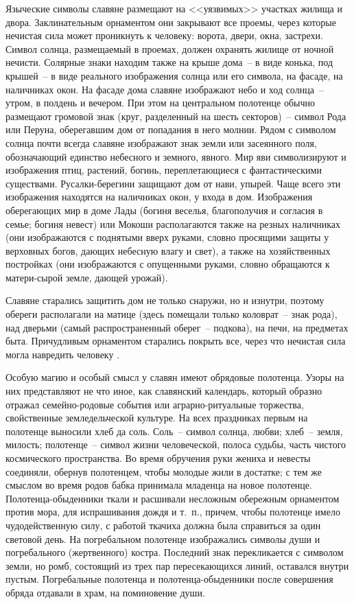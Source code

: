 \documentclass[pscyr,chapters]{hedwork}
\begin{document}
  Языческие символы славяне размещают на <<уязвимых>> участках жилища и двора.
  Заклинательным орнаментом они закрывают все проемы, через которые нечистая
  сила может проникнуть к человеку: ворота, двери, окна, застрехи. Символ
  солнца, размещаемый в проемах, должен охранять жилище от ночной нечисти.
  Солярные знаки находим также на крыше дома~-- в виде конька, под крышей~-- в
  виде реального изображения солнца или его символа, на фасаде, на наличниках
  окон. На фасаде дома славяне изображают небо и ход солнца~-- утром, в полдень
  и вечером. При этом на центральном полотенце обычно размещают громовой знак
  (круг, разделенный на шесть секторов)~-- символ Рода или Перуна, оберегавшим
  дом от попадания в него молнии. Рядом с символом солнца почти всегда славяне
  изображают знак земли или засеянного поля, обозначающий единство небесного и
  земного, явного. Мир яви символизируют и изображения птиц, растений, богинь,
  переплетающиеся с фантастическими существами. Русалки-берегини защищают дом от
  нави, упырей. Чаще всего эти изображения находятся на наличниках окон, у входа
  в дом. Изображения оберегающих мир в доме Лады (богиня веселья, благополучия и
  согласия в семье; богиня невест) или Мокоши располагаются также на резных
  наличниках (они изображаются с поднятыми вверх руками, словно просящими защиты
  у верховных богов, дающих небесную влагу и свет), а также на хозяйственных
  постройках (они изображаются с опущенными руками, словно обращаются к
  матери-сырой земле, дающей урожай).
 
  Славяне старались защитить дом не только снаружи, но и изнутри, поэтому
  обереги располагали на матице (здесь помещали только коловрат~-- знак рода),
  над дверьми (самый распространенный оберег~-- подкова), на печи, на предметах
  быта. Причудливым орнаментом старались покрыть все, через что нечистая сила
  могла навредить человеку \cite{2}.

  Особую магию и особый смысл у славян имеют обрядовые полотенца. Узоры на них
  представляют не что иное, как славянский календарь, который образно отражал
  семейно-родовые события или аграрно-ритуальные торжества, свойственные
  земледельческой культуре. На всех праздниках первым на полотенце выносили хлеб
  да соль. Соль~-- символ солнца, любви; хлеб~-- земля, милость; полотенце~--
  символ жизни человеческой, полоса судьбы, часть чистого космического
  пространства. Во время обручения руки жениха и невесты соединяли, обернув
  полотенцем, чтобы молодые жили в достатке; с тем же смыслом во время родов
  бабка принимала младенца на новое полотенце. Полотенца-обыденники ткали и
  расшивали несложным обережным орнаментом против мора, для испрашивания дождя
  и т.~п., причем, чтобы полотенце имело чудодейственную силу, с работой ткачиха
  должна была справиться за один световой день. На погребальном полотенце
  изображались символы души и погребального (жертвенного) костра. Последний знак
  перекликается с символом земли, но ромб, состоящий из трех пар пересекающихся
  линий, оставался внутри пустым. Погребальные полотенца и полотенца-обыденники
  после совершения обряда отдавали в храм, на поминовение души.
\end{document}
